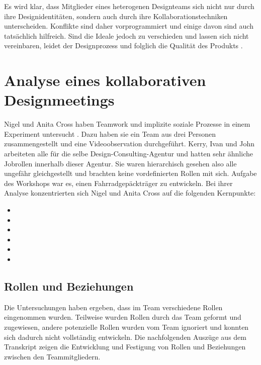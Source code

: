 \medskip Es wird klar, dass Mitglieder eines heterogenen Designteams sich nicht nur durch ihre Designidentitäten, sondern auch durch ihre Kollaborationstechniken unterscheiden. Konflikte sind daher vorprogrammiert und einige davon sind auch tatsächlich hilfreich. Sind die Ideale jedoch zu verschieden und lassen sich nicht vereinbaren, leidet der Designprozess und folglich die Qualität des Produkts \citep{Kilker:1999}. 

\section{Analyse eines kollaborativen Designmeetings} 

Nigel und Anita Cross haben Teamwork und implizite soziale Prozesse in einem Experiment untersucht \citep{Cross:1995}. Dazu haben sie ein Team aus drei Personen zusammengestellt und eine Videoobservation durchgeführt. Kerry, Ivan und John arbeiteten alle für die selbe Design-Consulting-Agentur und hatten sehr ähnliche Jobrollen innerhalb dieser Agentur. Sie waren hierarchisch gesehen also alle ungefähr gleichgestellt und brachten keine vordefinierten Rollen mit sich. Aufgabe des Workshops war es, einen Fahrradgepäckträger zu entwickeln. Bei ihrer Analyse konzentrierten sich Nigel und Anita Cross auf die folgenden Kernpunkte:

\begin{itemize}
	\item {}
	\item {}
	\item {}
	\item {}
	\item {}
	\item {}
\end{itemize}

\subsection{Rollen und Beziehungen}\label{sec:collabRoles} 

Die Untersuchungen haben ergeben, dass im Team verschiedene Rollen eingenommen wurden. Teilweise wurden Rollen durch das Team geformt und zugewiesen, andere potenzielle Rollen wurden vom Team ignoriert und konnten sich dadurch nicht vollständig entwickeln. Die nachfolgenden Auszüge aus dem Transkript zeigen die Entwicklung und Festigung von Rollen und Beziehungen zwischen den Teammitgliedern.

